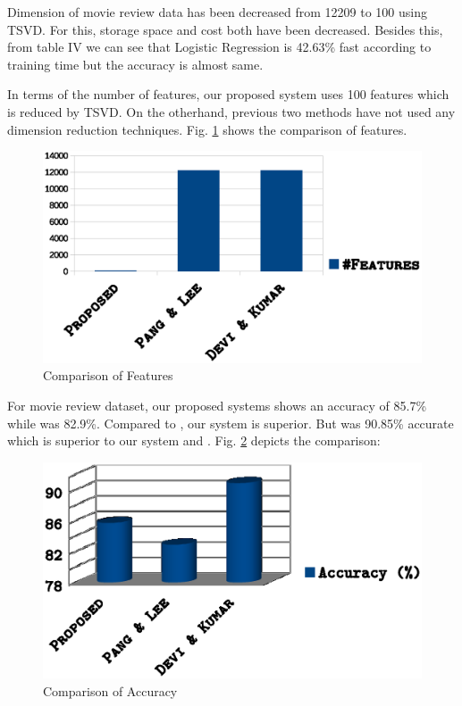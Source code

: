 \documentclass[10pt, conference]{IEEEtran}
\begin{document}
	Dimension of movie review data has been decreased from 12209 to 100 using TSVD. For this, storage space and cost both have been decreased. Besides this, from table IV we can see that Logistic Regression is 42.63\% fast according to training time but the accuracy is almost same.
	
	In terms of the number of features, our proposed system uses 100 features which is reduced by TSVD. On the otherhand, previous two methods \cite{b11, b14} have not used any dimension reduction techniques. Fig. \ref{fig:fea} shows the comparison of features.
	
	\begin{figure}[H]
		\includegraphics[width = 0.35\textheight]{features.eps}	\caption{Comparison of Features}
		\label{fig:fea}
	\end{figure}
	
	For movie review dataset, our proposed systems shows an accuracy of 85.7\% while \cite{b11} was 82.9\%. Compared to \cite{b11}, our system is superior. But \cite{b14} was 90.85\% accurate which is superior to our system and \cite{b11}. Fig. \ref{fig:acc} depicts the comparison:
    \begin{figure}[H]
    \includegraphics[width = 0.35\textheight]{acc.eps}
    \caption{Comparison of Accuracy}
    \label{fig:acc}
    \end{figure}
	
\end{document}
